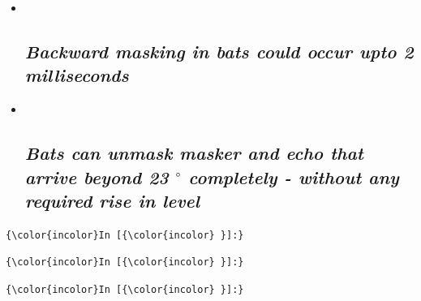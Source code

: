 \documentclass[11pt]{article}
\begin{document}
\begin{itemize}
\item ~
  \hypertarget{backward-masking-in-bats-could-occur-upto-2-milliseconds}{%
  \subsection{\texorpdfstring{\emph{Backward masking in bats could occur
  upto 2
  milliseconds}}{Backward masking in bats could occur upto 2 milliseconds}}\label{backward-masking-in-bats-could-occur-upto-2-milliseconds}}
\item ~
  \hypertarget{bats-can-unmask-masker-and-echo-that-arrive-beyond-23-circ-completely---without-any-required-rise-in-level}{%
  \subsection{\texorpdfstring{\emph{Bats can unmask masker and echo that
  arrive beyond 23 \(^\circ\) completely - without any required rise in
  level}}{Bats can unmask masker and echo that arrive beyond 23 \^{}\textbackslash{}circ completely - without any required rise in level}}\label{bats-can-unmask-masker-and-echo-that-arrive-beyond-23-circ-completely---without-any-required-rise-in-level}}
\end{itemize}

    

    \begin{Verbatim}[commandchars=\\\{\}]
{\color{incolor}In [{\color{incolor} }]:} 
\end{Verbatim}

    \begin{Verbatim}[commandchars=\\\{\}]
{\color{incolor}In [{\color{incolor} }]:} 
\end{Verbatim}

    \begin{Verbatim}[commandchars=\\\{\}]
{\color{incolor}In [{\color{incolor} }]:} 
\end{Verbatim}


    
    
    
    
\end{document}
